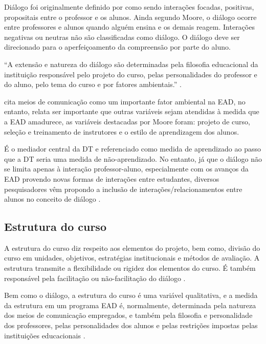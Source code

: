 Diálogo foi originalmente definido por  como
sendo interações focadas, positivas, propositais entre o professor e os alunos.
Ainda segundo Moore, o diálogo ocorre entre professores e alunos quando alguém
ensina e os demais reagem. Interações negativas ou neutras não são classificadas
como diálogo. O diálogo deve ser direcionado para o aperfeiçoamento da
compreensão por parte do aluno.

``A extensão e natureza do diálogo são determinadas pela filosofia educacional
da instituição responsável pelo projeto do curso, pelas personalidades do
professor e do aluno, pelo tema do curso e por fatores ambientais.''
\cite[p.~438]{cabau2018teoria}.

 cita meios de comunicação como um importante
fator ambiental na EAD, no entanto, relata ser importante que outras variáveis
sejam atendidas à medida que a EAD amadurece, as variáveis destacadas por Moore
foram: projeto de curso, seleção e treinamento de instrutores e o estilo de
aprendizagem dos alunos.

É o mediador central da DT e referenciado como medida de aprendizado ao passo
que a DT seria uma medida de não-aprendizado. No entanto, já que o diálogo não
se limita apenas à interação professor-aluno, especialmente com os avanços da
EAD provendo novas formas de interações entre estudantes, diversos pesquisadores
vêm propondo a inclusão de interações/relacionamentos entre alunos no conceito
de diálogo
\cite{benson2009addressing,chen1999dimensions,huang2016understanding}.

\subsection{Estrutura do curso}

A estrutura do curso diz respeito aos elementos do projeto, bem como, divisão do
curso em unidades, objetivos, estratégias institucionais e métodos de avaliação.
A estrutura transmite a flexibilidade ou rigidez dos elementos do curso. É também
responsável pela facilitação ou não-facilitação do diálogo
\cite{moore2008teoria}.

Bem como o diálogo, a estrutura do curso é uma variável qualitativa, e a
medida da estrutura em um programa EAD é, normalmente, determinada pela natureza
dos meios de comunicação empregados, e também pela filosofia e personalidade dos
professores, pelas personalidades dos alunos e pelas restrições impostas pelas
instituições educacionais \cite{moore2008teoria}.

